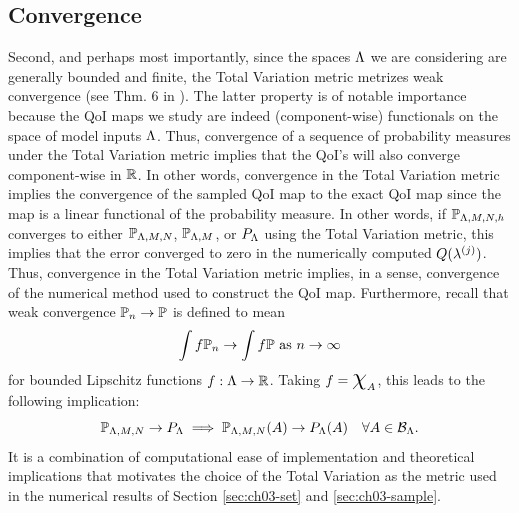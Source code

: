 \subsection{Convergence}
Second, and perhaps most importantly, since the spaces ${\Lambda}$ we are considering are generally bounded and finite, the Total Variation metric metrizes weak convergence (see Thm. 6 in \cite{GS02}).
The latter property is of notable importance because the QoI maps we study are indeed (component-wise) functionals on the space of model inputs ${\Lambda}$.
Thus, convergence of a sequence of probability measures under the Total Variation metric implies that the QoI's will also converge component-wise in $\mathbb{R}$.
In other words, convergence in the Total Variation metric implies the convergence of the sampled QoI map to the exact QoI map since the map is a linear functional of the probability measure.
In other words, if $\mathbb{P}_{{\Lambda},M,N,h}$ converges to either $\mathbb{P}_{{\Lambda},M,N}$, $\mathbb{P}_{{\Lambda},M}$, or $P_{\Lambda}$ using the Total Variation metric, this implies that the error converged to zero in the numerically computed $Q(\lambda^{(j)})$.
Thus, convergence in the Total Variation metric implies, in a sense, convergence of the numerical method used to construct the QoI map.
Furthermore, recall that weak convergence $\mathbb{P}_n \to \mathbb{P}$ is defined to mean
\[
\int f \mathbb{P}_n \to \int f \mathbb{P} \text{ as } n \to \infty
\]
for bounded Lipschitz functions $f:{\Lambda}\to\mathbb{R}$.
Taking $f = \Chi_A$, this leads to the following implication:
\[
\mathbb{P}_{{\Lambda}, M, N} \to P_{\Lambda} \implies \mathbb{P}_{{\Lambda}, M, N} (A) \to P_{\Lambda} (A) \quad \forall{A\in\mathcal{B}_{{\Lambda}}}.
\]
It is a combination of computational ease of implementation and theoretical implications that motivates the choice of the Total Variation as the metric used in the numerical results of Section \ref{sec:ch03-set} and \ref{sec:ch03-sample}.







